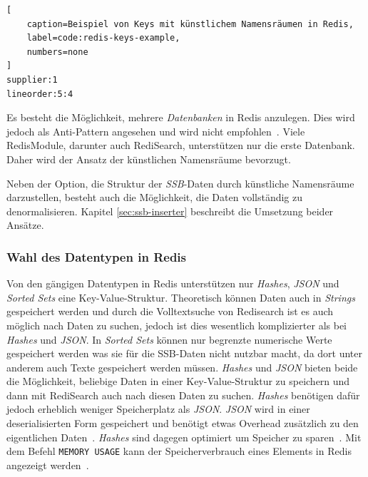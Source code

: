 \begin{lstlisting}[
    caption=Beispiel von Keys mit künstlichem Namensräumen in Redis,
    label=code:redis-keys-example,
    numbers=none
]
supplier:1
lineorder:5:4
\end{lstlisting}


Es besteht die Möglichkeit, mehrere \emph{Datenbanken} in Redis anzulegen.
Dies wird jedoch als Anti-Pattern angesehen und wird nicht empfohlen~\cite{prickett_answer_2022}. Viele RedisModule, darunter auch RediSearch, unterstützen nur die erste Datenbank. Daher wird der Ansatz der künstlichen Namensräume bevorzugt. 

Neben der Option, die Struktur der \emph{SSB}-Daten durch künstliche Namensräume darzustellen, besteht auch die Möglichkeit, die Daten vollständig zu denormalisieren. Kapitel \ref{sec:ssb-inserter} beschreibt die Umsetzung beider Ansätze.


\subsubsection{Wahl des Datentypen in Redis}
Von den gängigen Datentypen in Redis unterstützen nur \emph{Hashes}, \emph{JSON} und \emph{Sorted Sets} eine Key-Value-Struktur. Theoretisch können Daten auch in \emph{Strings} gespeichert werden und durch die Volltextsuche von Redisearch ist es auch möglich nach Daten zu suchen, jedoch ist dies wesentlich komplizierter als bei \emph{Hashes} und \emph{JSON}.
In \emph{Sorted Sets} können nur begrenzte numerische Werte gespeichert werden was sie für die SSB-Daten nicht nutzbar macht, da dort unter anderem auch Texte gespeichert werden müssen.
\emph{Hashes} und \emph{JSON} bieten beide die Möglichkeit, beliebige Daten in einer Key-Value-Struktur zu speichern und dann mit RediSearch auch nach diesen Daten zu suchen.
\emph{Hashes} benötigen dafür jedoch erheblich weniger Speicherplatz als \emph{JSON}.
\emph{JSON} wird in einer deserialisierten Form gespeichert und benötigt etwas Overhead zusätzlich zu den eigentlichen Daten~\cite{redis_ltd_json-ram-usage_nodate}.
\emph{Hashes} sind dagegen optimiert um Speicher zu sparen~\cite{redis_ltd_memory-optimization_nodate}.
Mit dem Befehl \lstinline|MEMORY USAGE| kann der Speicherverbrauch eines Elements in Redis angezeigt werden~\cite{redis_ltd_memory-usage-command-redis_nodate}.

